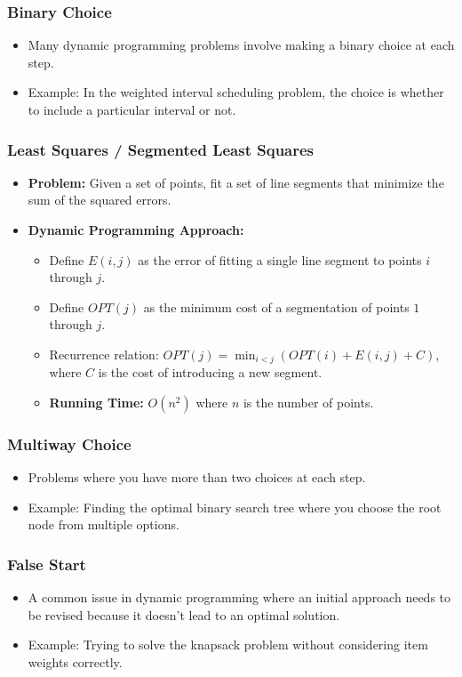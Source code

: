 \documentclass[8pt]{article}
\begin{document}
\subsubsection*{Binary Choice}
\begin{itemize}
    \item Many dynamic programming problems involve making a binary choice at each step.
    \item Example: In the weighted interval scheduling problem, the choice is whether to include a particular interval or not.
\end{itemize}

\subsubsection*{Least Squares / Segmented Least Squares}
\begin{itemize}
    \item \textbf{Problem:} Given a set of points, fit a set of line segments that minimize the sum of the squared errors.
    \item \textbf{Dynamic Programming Approach:}
    \begin{itemize}
        \item Define \(E(i, j)\) as the error of fitting a single line segment to points \(i\) through \(j\).
        \item Define \(OPT(j)\) as the minimum cost of a segmentation of points \(1\) through \(j\).
        \item Recurrence relation: \(OPT(j) = \min_{i < j} (OPT(i) + E(i, j) + C)\), where \(C\) is the cost of introducing a new segment.
        \item \textbf{Running Time:} \(O(n^2)\) where \(n\) is the number of points.
    \end{itemize}
\end{itemize}

\subsubsection*{Multiway Choice}
\begin{itemize}
    \item Problems where you have more than two choices at each step.
    \item Example: Finding the optimal binary search tree where you choose the root node from multiple options.
\end{itemize}

\subsubsection*{False Start}
\begin{itemize}
    \item A common issue in dynamic programming where an initial approach needs to be revised because it doesn't lead to an optimal solution.
    \item Example: Trying to solve the knapsack problem without considering item weights correctly.
\end{itemize}
\end{document}
